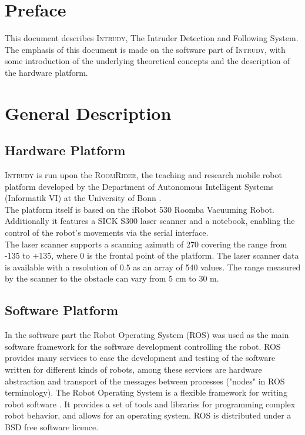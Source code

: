 \documentclass[12pt,a4paper]{scrartcl}
\newcommand{\intrudy}{\textsc{Intrudy}\xspace}
\newcommand{\degrees}{\textdegree\xspace}
\begin{document}


\tableofcontents
\newpage

{}
\section*{Preface}
	\label{sec:preface}
	This document describes \intrudy, The Intruder Detection and Following System. The emphasis of this document is made on the software part of \intrudy, with some introduction of the underlying theoretical concepts and the description of the hardware platform.


\section{General Description} %
	\label{sec:general_description}


	\subsection{Hardware Platform} %
	\label{sub:hardware_platform}

		\intrudy is run upon the \textsc{RoomRider}, the teaching and research mobile robot platform developed by the Department of Autonomous Intelligent Systems (Informatik VI) at the University of Bonn \cite[III.A. Roomrider]{goerke2009}.\\
		The platform itself is based on the iRobot 530 Roomba Vacuuming Robot. Additionally it features a SICK S300 laser scanner and a notebook, enabling the control of the robot's movements via the serial interface.\\ 
		The laser scanner supports a scanning azimuth of 270\degrees covering the range from -135\degrees to +135\degrees, where 0\degrees is the frontal point of the platform. The laser scanner data is available with a resolution of 0.5\degrees as an array of 540 values. The range measured by the scanner to the obstacle can vary from 5 cm to 30 m.


	\subsection{Software Platform} %
	\label{sub:software_platform}

		In the software part the Robot Operating System (ROS) was used as the main software framework for the software development controlling the robot\cite{ROSmain}. ROS provides many services to ease the development and testing of the software written for different kinds of robots, among these services are hardware abstraction and transport of the messages between processes ("nodes" in ROS terminology). The Robot Operating System is a flexible framework for writing robot software \cite{ROSmain}. It provides a set of tools and libraries for programming complex robot behavior, and allows for an operating system. ROS is distributed under a BSD free software licence.
\end{document}
